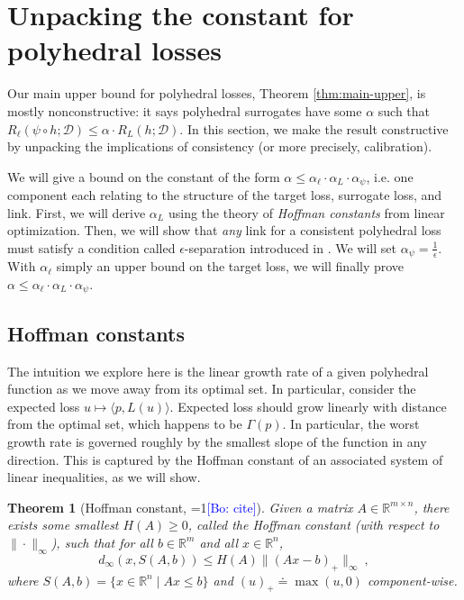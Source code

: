 \documentclass{article}
\newtheorem{theorem}{Theorem}
\theoremstyle{definition}\newtheorem{definition}{Definition}
\theoremstyle{definition}\newtheorem{assumption}{Assumption}
\newcommand{\Comments}{1}
\newcommand{\mynote}[2]{\ifnum\Comments=1\textcolor{#1}{#2}\fi}
\newcommand{\bo}[1]{\mynote{blue}{[Bo: #1]}}
\newcommand{\reals}{\mathbb{R}}
\newcommand{\defeq}{\doteq}%
\newcommand{\D}{\mathcal{D}}
\newcommand{\inprod}[2]{\langle #1, #2 \rangle}%
\begin{document}
\section{Unpacking the constant for polyhedral losses}

Our main upper bound for polyhedral losses, Theorem \ref{thm:main-upper}, is mostly nonconstructive: it says polyhedral surrogates have some $\alpha$ such that $R_{\ell}(\psi \circ h; \D) \leq \alpha \cdot R_L(h;\D)$.
In this section, we make the result constructive by unpacking the implications of consistency (or more precisely, calibration).

We will give a bound on the constant of the form $\alpha \leq \alpha_{\ell} \cdot \alpha_L \cdot \alpha_{\psi}$, i.e. one component each relating to the structure of the target loss, surrogate loss, and link.
First, we will derive $\alpha_L$ using the theory of \emph{Hoffman constants} from linear optimization.
Then, we will show that \emph{any} link for a consistent polyhedral loss must satisfy a condition called $\epsilon$-separation introduced in \cite{finocchiario2020}.
We will set $\alpha_{\psi} = \frac{1}{\epsilon}$.
With $\alpha_{\ell}$ simply an upper bound on the target loss, we will finally prove $\alpha \leq \alpha_{\ell} \cdot \alpha_L \cdot \alpha_{\psi}$.

\subsection{Hoffman constants}
The intuition we explore here is the linear growth rate of a given polyhedral function as we move away from its optimal set.
In particular, consider the expected loss $u \mapsto \inprod{p}{L(u)}$.
Expected loss should grow linearly with distance from the optimal set, which happens to be $\Gamma(p)$.
In particular, the worst growth rate is governed roughly by the smallest slope of the function in any direction.
This is captured by the Hoffman constant of an associated system of linear inequalities, as we will show.

\begin{theorem}[Hoffman constant, \bo{cite}]
  \label{thm:hoffman}
  Given a matrix $A\in\reals^{m\times n}$, there exists some smallest $H(A)\geq 0$, called the \emph{Hoffman constant} (with respect to $\|\cdot\|_\infty$), such that for all $b\in\reals^m$ and all $x\in\reals^n$,
  \begin{equation}
    \label{eq:hoffman}
    d_\infty(x,S(A,b)) \leq H(A) \|(A x - b)_+\|_\infty~,
  \end{equation}
  where $S(A,b) = \{x\in\reals^n \mid A x \leq b\}$ and $(u)_+ \defeq \max(u,0)$ component-wise.
\end{theorem}
\end{document}
